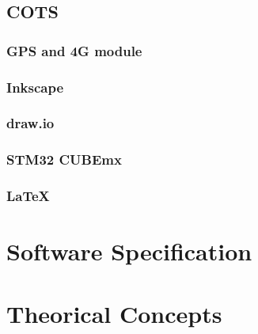 \subsection{COTS}
\subsubsection{GPS and 4G module}
\subsubsection{Inkscape}
\subsubsection{draw.io}
\subsubsection{STM32 CUBEmx}
\subsubsection{\LaTeX}
\section{Software Specification}
\section{Theorical Concepts}